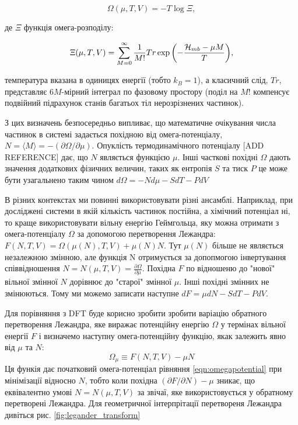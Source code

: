 \begin{equation}
\label{eqn:omegapotential}
	\Omega(\mu,T,V) = -T\log\Xi,
\end{equation}
 
де $\Xi$ функція омега-розподілу:

\begin{equation}
\label{eqn:sgranddistr}
	\Xi(\mu, T, V) = \sum\limits_{M = 0}^\infty\frac{1}{M!}Tr\exp{\left(-\frac{{\cal H}_{mb} - {\mu} M}{T}\right)},
\end{equation}

температура вказана в одиницях енергії (тобто $k_{B} = 1$), а класичний слід, $Tr$, представляє $6M$-мірний інтеграл по фазовому простору (поділ на $M!$ компенсує подвійний підрахунок станів багатьох тіл нерозрізнених частинок). 

З цих визначень безпосередньо випливає, що математичне очікування числа частинок в системі задається похідною від омега-потенціалу, $N = \langle M \rangle = -(\partial{\Omega}/\partial{\mu})$. Опуклість термодинамічного потенціалу [ADD REFERENCE] дає, що $N$ являється функцією $\mu$. Інші часткові похідні $\Omega$ дають значення додаткових фізичних величин, таких як ентропія $S$ та тиск $P$ це може бути узагальнено таким чином $d\Omega = -Nd\mu - SdT - PdV$

В різних контекстах ми повинні використовувати різні ансамблі. Наприклад, при досліджені системи в якій кількість частинок постійна, а хімічний потенціал ні, то краще використовувати вільну енергію Геймгольца, яку можна отримати з омега-потенціалу $\Omega$ за допомогою перетворення Лежандра: $F(N,T,V) = \Omega(\mu(N),T,V)+\mu(N)N.$
Тут $\mu(N)$ більше не являється незалежною змінною, але функція N отримується за допопмогою інвертування співвідношення $N = N({\mu},T,V)=\frac{\partial\Omega}{\partial\mu}.$ Похідна $F$ по відношеню до "нової" вільної змінної $N$ дорівнює до "старої" змінної $\mu$. Інші похідні змінних не змінюються. Тому ми можемо записати наступне $dF={\mu}dN - SdT - PdV$.

Для порівняння з DFT буде корисно зробити зробити варіацію обратного перетворення Лежандра, яке виражає потенційну енергію $\Omega$ у термінах вільної енергії $F$ і визначемо наступну омега-потенційну функцію, якак залежить явно від $\mu$ та $N$:
\begin{equation}
	\label{eqn:grand-potentialfunc}
	\Omega_\mu \equiv F(N,T,V) - {\mu} N
\end{equation}
Ця функія дає початковий омега-потенціал рівняння \ref{eqn:omegapotential} при мінімізації відносно $N$, тобто коли похідна $(\partial{F}/\partial{N}) - \mu$ зникає, що еквівалентно умові $N = N(\mu,T,V)$ за звічаї, яке використовується у обратному перетворені Лежандра. Для геометричної інтерпрітації перетвореня Лежандра дивіться рис. \ref{fig:legander_transform}

